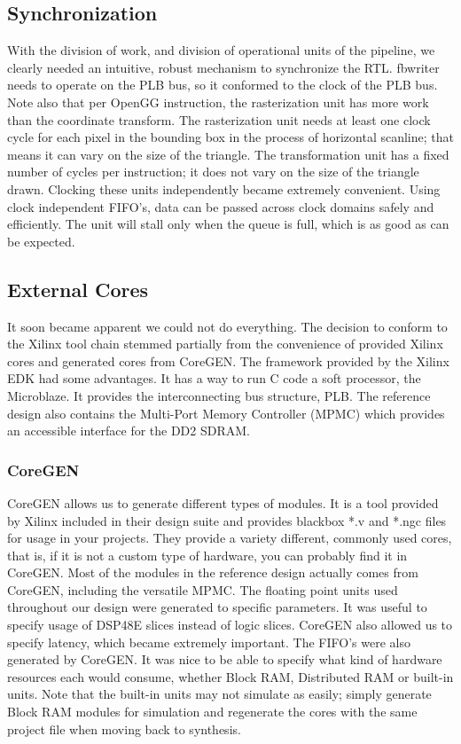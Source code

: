\documentclass[letterpaper,10pt]{article}
\begin{document}
\subsection{Synchronization}
With the division of work, and division of operational units of the pipeline, we clearly needed an intuitive, robust mechanism to synchronize the RTL.  fbwriter needs to operate on the PLB bus, so it conformed to the clock of the PLB bus.  Note also that per OpenGG instruction, the rasterization unit has more work than the coordinate transform.  The rasterization unit needs at least one clock cycle for each pixel in the bounding box in the process of horizontal scanline; that means it can vary on the size of the triangle.  The transformation unit has a fixed number of cycles per instruction; it does not vary on the size of the triangle drawn.  Clocking these units independently became extremely convenient.  Using clock independent FIFO's, data can be passed across clock domains safely and efficiently.  The unit will stall only when the queue is full, which is as good as can be expected.

\subsection{External Cores}
It soon became apparent we could not do everything. The decision to conform to the Xilinx tool chain stemmed partially from the convenience of provided Xilinx cores and generated cores from CoreGEN.  The framework provided by the Xilinx EDK had some advantages.  It has a way to run C code a soft processor, the Microblaze.  It provides the interconnecting bus structure, PLB.  The reference design also contains the Multi-Port Memory Controller (MPMC) which provides an accessible interface for the DD2 SDRAM.  

\subsubsection{CoreGEN}
CoreGEN allows us to generate different types of modules.  It is a tool provided by Xilinx included in their design suite and provides blackbox *.v and *.ngc files for usage in your projects.  They provide a variety different, commonly used cores, that is, if it is not a custom type of hardware, you can probably find it in CoreGEN.  Most of the modules in the reference design actually comes from CoreGEN, including the versatile MPMC.  The floating point units used throughout our design were generated to specific parameters.  It was useful to specify usage of DSP48E slices instead of logic slices.  CoreGEN also allowed us to specify latency, which became extremely important.  The FIFO's were also generated by CoreGEN.  It was nice to be able to specify what kind of hardware resources each would consume, whether Block RAM, Distributed RAM or built-in units.  Note that the built-in units may not simulate as easily; simply generate Block RAM modules for simulation and regenerate the cores with the same project file when moving back to synthesis.
\end{document}
